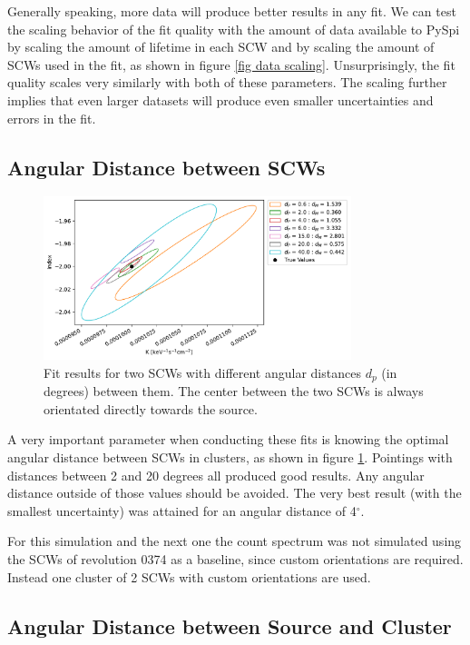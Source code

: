 \documentclass{report}
\begin{document}
Generally speaking, more data will produce better results in any fit. We can test the scaling behavior of the fit quality with the amount of data available to PySpi by scaling the amount of lifetime in each SCW and by scaling the amount of SCWs used in the fit, as shown in figure \ref{fig data scaling}. Unsurprisingly, the fit quality scales very similarly with both of these parameters. The scaling further implies that even larger datasets will produce even smaller uncertainties and errors in the fit. 


\subsection{Angular Distance between SCWs}

\begin{figure}[h]
  \centering
  \includegraphics[width=0.8\textwidth]{Images/Pure_Simulation/combined_plot_pointing_distances.pdf}
  \caption{Fit results for two SCWs with different angular distances $d_p$ (in degrees) between them. The center between the two SCWs is always orientated directly towards the source.}
  \label{fig pointing distances}
\end{figure}

A very important parameter when conducting these fits is knowing the optimal angular distance between SCWs in clusters, as shown in figure \ref{fig pointing distances}. Pointings with distances between 2 and 20 degrees all produced good results. Any angular distance outside of those values should be avoided. The very best result (with the smallest uncertainty) was attained for an angular distance of 4$^\circ$.

For this simulation and the next one the count spectrum was not simulated using the SCWs of revolution 0374 as a baseline, since custom orientations are required. Instead one cluster of 2 SCWs with custom orientations are used.


\subsection{Angular Distance between Source and Cluster}
\end{document}
